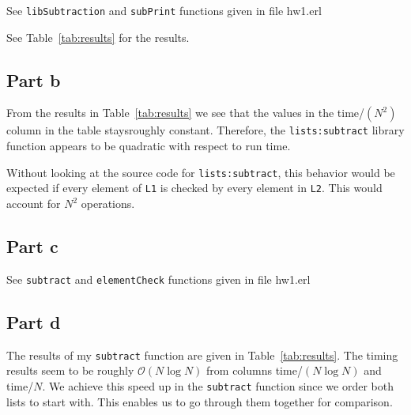 \documentclass{article}
\begin{document}
See {\tt libSubtraction} and {\tt subPrint} functions given in file hw1.erl

\noindent See Table~\ref{tab:results} for the results.




\subsection*{Part b}

From the results in Table~\ref{tab:results}  we see that the values in the time/$(N^2)$ column in the table staysroughly constant. Therefore, the {\tt lists:subtract} library function appears to be quadratic with respect to run time.

Without looking at the source code for {\tt lists:subtract}, this behavior would be expected if every element of {\tt L1} is checked by every element in {\tt L2}. This would account for $N^2$ operations.

\subsection*{Part c}

See {\tt subtract} and {\tt elementCheck} functions given in file hw1.erl

\subsection*{Part d}

The results of my {\tt subtract} function are given in Table~\ref{tab:results}. The timing results seem to be roughly $\mathcal{O}(N \log N)$ from columns time/$(N\log N)$ and time/$N$. We achieve this speed up in the {\tt subtract} function since we order both lists to start with. This enables us to go through them together for comparison.
\end{document}
